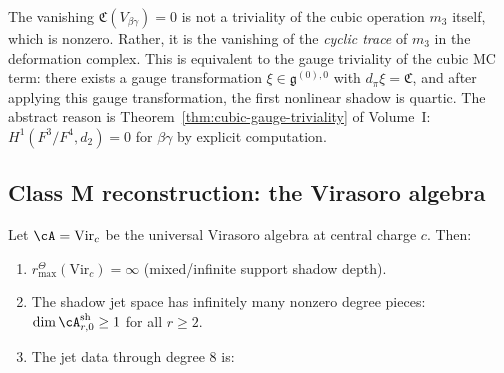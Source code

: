 \begin{remark}
The vanishing $\mathfrak{C}(V_{\beta\gamma}) = 0$ is not a triviality of the cubic
operation $m_3$ itself, which is nonzero. Rather, it is the vanishing of the
\emph{cyclic trace} of $m_3$ in the deformation complex. This is equivalent to the
gauge triviality of the cubic MC term: there exists a gauge transformation
$\xi \in \mathfrak{g}^{(0),0}$ with $d_\pi \xi = \mathfrak{C}$, and after applying
this gauge transformation, the first nonlinear shadow is quartic. The abstract reason
is Theorem~\ref*{thm:cubic-gauge-triviality} of Volume~I: $H^1(F^3/F^4, d_2) = 0$ for
$\beta\gamma$ by explicit computation.
\end{remark}

\subsection{Class M reconstruction: the Virasoro algebra}

\begin{theorem}
Let $\cA = \mathrm{Vir}_c$ be the universal Virasoro algebra at central charge $c$.
Then:
\begin{enumerate}[label=\textup{(\roman*)}]
\item \(r^\Theta_{\max}(\mathrm{Vir}_c) = \infty\) (mixed/infinite support shadow depth).
\item The shadow jet space has infinitely many nonzero degree pieces:
 $\dim \cA^{\mathrm{sh}}_{r,0} \geq 1$ for all $r \geq 2$.
\item The jet data through degree $8$ is:
\end{enumerate}
\end{theorem}

